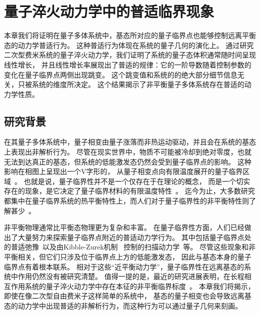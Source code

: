 
\chapter{量子淬火动力学中的普适临界现象}

	本章我们将证明在量子多体系统中，基态所对应的量子临界点也能够控制远离平衡态的动力学普适行为。
	这种普适行为体现在系统的量子几何的演化上。
	通过研究二次型费米系统的量子淬火动力学，我们证明了系统的量子态体积通常随时间呈现线性增长， 并且线性增长率展现出了普适的规律：它的一阶导数随着控制参数的变化在量子临界点两侧出现跳变。
	这个跳变值和系统的的绝大部分细节信息无关，只被系统的维度所决定。
	这个结果揭示了非平衡量子多体系统存在普适的动力学性质。

	\section{研究背景}
	
		在其量子多体系统中，量子相变由量子涨落而非热运动驱动，并且会在系统的基态上表现出非解析行为。
		尽管在现实世界中，物质不可能被冷却到绝对零度，也就无法到达真正的基态，但系统的低能激发态仍然会受到量子临界点的影响。
		这种影响在相图上呈现出一个V字形的， 从量子相变点向有限温度展开的量子临界区域~\cite{Sachdev1999}。
		也就是说，量子临界性并不是一个仅存在于在理论的概念， 而是一个切实存在的现象，是它决定了量子临界材料的有限温度特性~\cite{Coleman2005}。
		迄今为止，大多数研究都集中在量子临界系统的热平衡特性上，而人们对于量子临界性的非平衡特性则了解甚少~\cite{Torre2010}。
		
		非平衡物理通常比平衡态物理更为复杂和丰富。
		在量子临界性方面，人们已经做出了大量努力来探索量子临界点附近的普适动力学行为。
		其中包括量子临界点处的普适弛豫~\cite{Sachdev1997}以及由Kibble-Zurek机制~\cite{Kibble1976,Zurek1985} 控制的扫描动力学~\cite{Zurek2005,Dziarmaga2005,Damski2005}等。
		尽管这些现象和非平衡相关，但它们只涉及位于临界点上方的低能激发态， 因此与基态本身的量子临界点有着根本联系。
		相对于这些“近平衡动力学”，量子临界性在远离基态的系统中作用仍然没有被研究清楚。
		值得一提的是，最近的研究进展表明，在长程相互作用系统的量子淬火动力学中存在本征的非平衡临界标度~\cite{Titum2020,De2023}。
		本章我们将揭示，即使在像二次型自由费米子这样简单的系统中， 基态的量子相变也会导致远离基态的动力学中出现普适的非解析行为，而这种行为可以通过量子几何来刻画。
		
